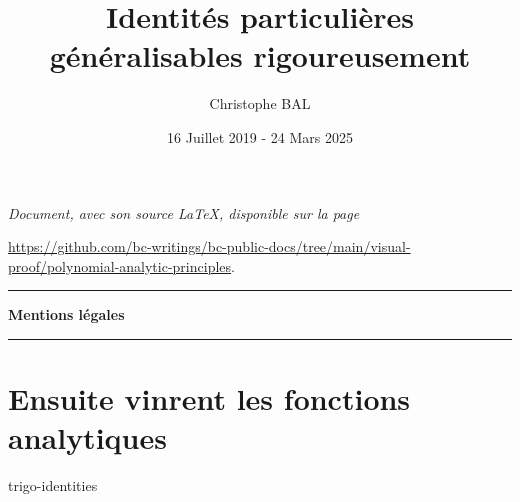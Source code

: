 \documentclass[12pt]{amsart}
\begin{document}
\title{Identités particulières généralisables rigoureusement}
\author{Christophe BAL}
\date{16 Juillet 2019 - 24 Mars 2025}

\maketitle

\begin{center}
	\itshape
	Document, avec son source \LaTeX, disponible sur la page

	\url{https://github.com/bc-writings/bc-public-docs/tree/main/visual-proof/polynomial-analytic-principles}.
\end{center}


\bigskip


\begin{center}
	\hrule\vspace{.3em}
	{
		\fontsize{1.35em}{1em}\selectfont
		\textbf{Mentions \og légales \fg}
	}

	\vspace{0.45em}
	\doclicenseThis
	\hrule
\end{center}


\bigskip


\setcounter{tocdepth}{1}
\tableofcontents



%
%
%
%
%
%

\newpage

\section{Ensuite vinrent les fonctions analytiques}

{trigo-identities}
\end{document}
